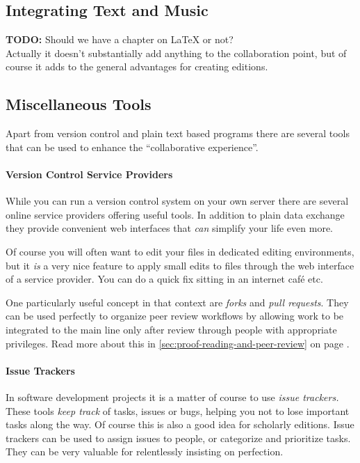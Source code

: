 \documentclass[11pt,a4paper]{article}
\begin{document}
\subsection{Integrating Text and Music}
\textbf{TODO:} Should we have a chapter on LaTeX or not?\\
Actually it doesn't substantially add anything to the collaboration point,
but of course it adds to the general advantages for creating editions.

\subsection{Miscellaneous Tools}
Apart from version control and plain text based programs there are several tools that
can be used to enhance the “collaborative experience”.

\paragraph{Version Control Service Providers}
While you can run a version control system on your own server there are several online service providers offering useful tools. In addition to plain data exchange they
provide convenient web interfaces that \emph{can} simplify your life even more.

Of course you will often want to edit your files in dedicated editing environments, but
it \emph{is} a very nice feature to apply small edits to files through the web interface
of a service provider. You can do a quick fix sitting in an internet café etc.

One particularly useful concept in that context are \emph{forks} and \emph{pull requests}.
They can be used perfectly to organize peer review workflows by allowing work to be
integrated to the main line only after review through people with appropriate privileges.
Read more about this in \ref{sec:proof-reading-and-peer-review} on page \pageref{sec:proof-reading-and-peer-review}.

\paragraph{Issue Trackers}
In software development projects it is a matter of course to use \emph{issue trackers.}
These tools \emph{keep track} of tasks, issues or bugs, helping you not to lose important
tasks along the way. Of course this is also a good idea for scholarly editions. Issue
trackers can be used to assign issues to people, or categorize and prioritize tasks.
They can be very valuable for relentlessly insisting on perfection.
\end{document}
